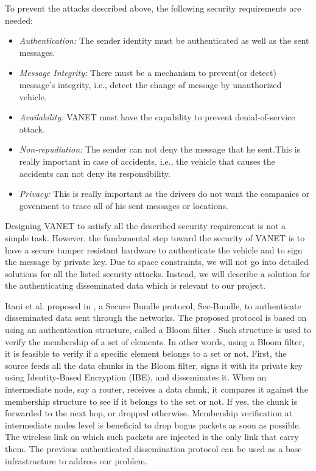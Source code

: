 \documentclass{IEEEtran}
\begin{document}
To prevent the attacks described above, the following security requirements are needed:
\begin{itemize}
\item \emph{Authentication:} The sender identity must be authenticated as well as the sent messages.
\item \emph{Message Integrity:} There must be a mechanism to prevent(or detect) message’s integrity, i.e., detect the change of message by unauthorized vehicle.
\item \emph{Availability:} VANET must have the capability to prevent denial-of-service attack.
\item \emph{Non-repudiation:} The sender can not deny the message that he sent.This is really important in case of accidents, i.e., the vehicle that causes the accidents can not deny its responsibility.
\item \emph{Privacy:} This is really important as the drivers do not want the companies or govenment to trace all of his sent messages or locations.
\end{itemize}
Designing VANET to satisfy all the described security requirement is not a simple task. However, the fundamental step toward the security of VANET is to have a secure tamper resistant hardware to authenticate the vehicle and to sign the message by private key. Due to space constraints, we will not go into detailed solutions for all the listed security attacks. Instead, we will describe a solution for the authenticating disseminated data which is relevant to our project.

Itani et al. proposed in \cite{slow}, a Secure Bundle protocol, Sec-Bundle, to authenticate disseminated data sent through the networks. The proposed protocol is based on using an authentication structure, called a Bloom filter \cite{bloomF}. Such structure is used to verify the membership of a set of elements. In other words, using a Bloom filter, it is feasible to verify if a specific element belongs to a set or not. First, the source feeds all the data chunks in the Bloom filter, signs it with its private key using Identity-Based Encryption (IBE), and disseminates it. When an intermediate node, say a router, receives a data chunk, it compares it against the membership structure to see if it belongs to the set or not. If yes, the chunk is forwarded to the next hop, or dropped otherwise. Membership verification at intermediate nodes level is beneficial to drop bogus packets as soon as possible. The wireless link on which such packets are injected is the only link that carry them. The previous authenticated 
dissemination protocol can be used as a base infrastructure to address our problem.
\end{document}
